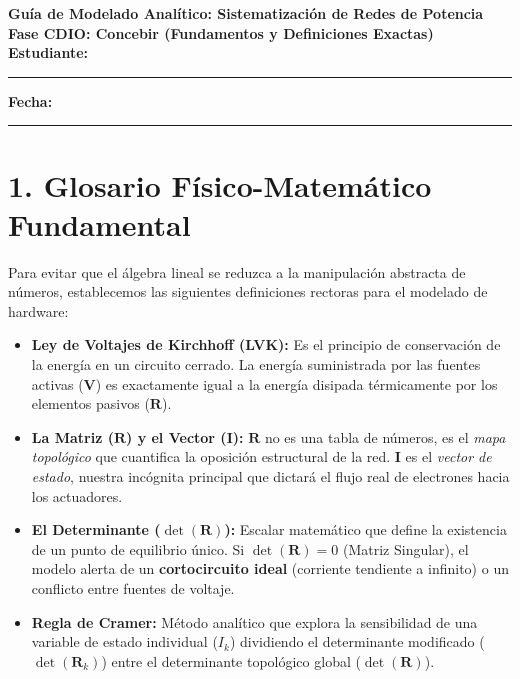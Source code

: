 \documentclass[11pt,a4paper]{article}
\begin{document}
\begin{center}
    {\Large \textbf{\textcolor{UCBblue}{Guía de Modelado Analítico: Sistematización de Redes de Potencia}}}\\
    \vspace{0.3cm}
    {\large \textbf{Fase CDIO: Concebir (Fundamentos y Definiciones Exactas)}}\\
    \vspace{0.5cm}
    \textbf{Estudiante:} \rule{8cm}{0.4pt} \quad \textbf{Fecha:} \rule{3cm}{0.4pt}
\end{center}

\vspace{0.3cm}

\section*{1. Glosario Físico-Matemático Fundamental}
Para evitar que el álgebra lineal se reduzca a la manipulación abstracta de números, establecemos las siguientes definiciones rectoras para el modelado de hardware:

\begin{itemize}
    \item \textbf{Ley de Voltajes de Kirchhoff (LVK):} Es el principio de conservación de la energía en un circuito cerrado. La energía suministrada por las fuentes activas ($\mathbf{V}$) es exactamente igual a la energía disipada térmicamente por los elementos pasivos ($\mathbf{R}$).
    \item \textbf{La Matriz ($\mathbf{R}$) y el Vector ($\mathbf{I}$):} $\mathbf{R}$ no es una tabla de números, es el \textit{mapa topológico} que cuantifica la oposición estructural de la red. $\mathbf{I}$ es el \textit{vector de estado}, nuestra incógnita principal que dictará el flujo real de electrones hacia los actuadores.
    \item \textbf{El Determinante ($\det(\mathbf{R})$):} Escalar matemático que define la existencia de un punto de equilibrio único. Si $\det(\mathbf{R}) = 0$ (Matriz Singular), el modelo alerta de un \textbf{cortocircuito ideal} (corriente tendiente a infinito) o un conflicto entre fuentes de voltaje.
    \item \textbf{Regla de Cramer:} Método analítico que explora la sensibilidad de una variable de estado individual ($I_k$) dividiendo el determinante modificado ($\det(\mathbf{R}_k)$) entre el determinante topológico global ($\det(\mathbf{R})$).
\end{itemize}
\end{document}
